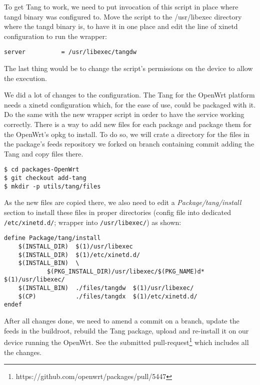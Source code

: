 To get Tang to work, we need to put invocation of this script in place where tangd binary was configured to.
Move the script to the /usr/libexec directory where the tangd binary is, to have it in one place and edit the line of xinetd configuration to run the wrapper:
\begin{lstlisting}[columns=fixed,basicstyle=\ttfamily\footnotesize,tabsize=4,backgroundcolor=\color{yellow!10}]
    server          = /usr/libexec/tangdw
\end{lstlisting}
The last thing would be to change the script's permissions on the device to allow the execution.

We did a lot of changes to the configuration.
The Tang for the OpenWrt platform needs a xinetd configuration which, for the ease of use, could be packaged with it.
Do the same with the new wrapper script in order to have the service working correctly.
There is a way to add new files for each package and package them for the OpenWrt's opkg to install.
To do so, we will crate a directory for the files in the package's feeds repository we forked on branch containing commit adding the Tang and copy files there.
\begin{lstlisting}[columns=fixed,basicstyle=\ttfamily\footnotesize,tabsize=4,backgroundcolor=\color{yellow!10}]
$ cd packages-OpenWrt
$ git checkout add-tang
$ mkdir -p utils/tang/files
\end{lstlisting}
As the new files are copied there, we also need to edit a {\it Package/tang/install} section to install these files in proper directories (config file into dedicated {\tt /etc/xinetd.d/}; wrapper into {\tt /usr/libexec/}) as shown:\newpage
\begin{lstlisting}[columns=fixed,basicstyle=\ttfamily\footnotesize,tabsize=4,backgroundcolor=\color{yellow!10}]
define Package/tang/install
	$(INSTALL_DIR)	$(1)/usr/libexec
	$(INSTALL_DIR)	$(1)/etc/xinetd.d/
	$(INSTALL_BIN)	\
			$(PKG_INSTALL_DIR)/usr/libexec/$(PKG_NAME)d*  $(1)/usr/libexec/
	$(INSTALL_BIN)	./files/tangdw	$(1)/usr/libexec/
	$(CP)			./files/tangdx	$(1)/etc/xinetd.d/
endef
\end{lstlisting}
After all changes done, we need to amend a commit on a branch, update the feeds in the buildroot, rebuild the Tang package, upload and re-install it on our device running the OpenWrt.
See the submitted pull-request\footnote{https://github.com/openwrt/packages/pull/5447} which includes all the changes.



